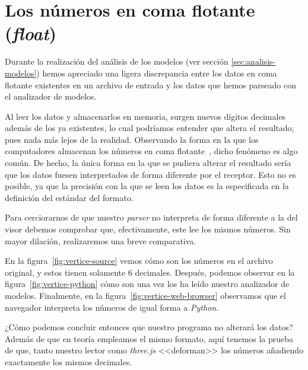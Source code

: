 \section{Los números en coma flotante (\textit{float})}
Durante la realización del análisis de los modelos (ver sección \ref{sec:analisis-modelos}) hemos apreciado una ligera discrepancia entre los datos en coma flotante existentes en un archivo de entrada y los datos que hemos parseado con el analizador de modelos.

Al leer los datos y almacenarlos en memoria, surgen nuevos dígitos decimales además de los ya existentes, lo cual podríamos entender que altera el resultado; pues nada más lejos de la realidad. Observando la forma en la que los computadores almacenan los números en coma flotante~\cite{wiki:float-numbers}, dicho fenómeno es algo común. De hecho, la única forma en la que se pudiera alterar el resultado sería que los datos fuesen interpretados de forma diferente por el receptor. Esto no es posible, ya que la precisión con la que se leen los datos es la especificada en la definición del estándar del formato.

Para cerciorarnos de que nuestro \textit{parser} no interpreta de forma diferente a la del visor debemos comprobar que, efectivamente, este lee los mismos números. Sin mayor dilación, realizaremos una breve comparativa.

En la figura~\ref{fig:vertice-source} vemos cómo son los números en el archivo original, y estos tienen solamente 6 decimales. Después, podemos observar en la figura~\ref{fig:vertice-python} cómo son una vez los ha leído nuestro analizador de modelos. Finalmente, en la figura~\ref{fig:vertice-web-browser} observamos que el navegador interpreta los números de igual forma a \textit{Python}.


¿Cómo podemos concluir entonces que nuestro programa no alterará los datos? Además de que en teoría empleamos el mismo formato, aquí tenemos la prueba de que, tanto nuestro lector como \textit{three.js} <<deforman>> los números añadiendo exactamente los mismos decimales.

